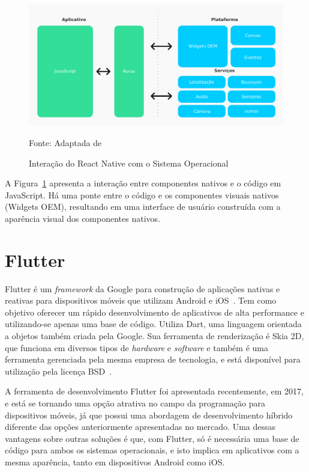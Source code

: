 \begin{figure}[H]
    \centering
    \includegraphics[width=15cm]{imagens/interacaoReactNative}
    \caption{Interação do React Native com o Sistema Operacional}
    Fonte: Adaptada de~\cite{yatsenko2019comparative}
    \label{fig: Interação React Native SO}
\end{figure}

A Figura~\ref{fig: Interação React Native SO} apresenta a interação entre componentes nativos e o código em JavaScript.
Há uma ponte entre o código e os componentes visuais nativos (Widgets OEM), resultando em uma interface de usuário construída com a aparência visual dos componentes nativos.


\section{Flutter}\label{sec:flutter}

Flutter é um \textit{framework} da Google para construção de aplicações nativas e reativas para dispositivos móveis que utilizam Android e iOS~\cite{zammetti2019practical}.
Tem como objetivo oferecer um rápido desenvolvimento de aplicativos de alta performance e utilizando-se apenas uma base de código.
Utiliza Dart, uma linguagem orientada a objetos também criada pela Google.
Sua ferramenta de renderização é Skia 2D, que funciona em diversos tipos de \textit{hardware} e \textit{software} e também é uma ferramenta gerenciada pela mesma empresa de tecnologia, e está disponível para utilização pela licença BSD~\cite{napoli2019beginning}.


A ferramenta de desenvolvimento Flutter foi apresentada recentemente, em 2017, e está se tornando uma opção atrativa no campo da programação para dispositivos móveis, já que possui uma abordagem de desenvolvimento híbrido diferente das opções anteriormente apresentadas no mercado.
Uma dessas vantagens sobre outras soluções é que, com Flutter, só é necessária uma base de código para ambos os sistemas operacionais, e isto implica em aplicativos com a mesma aparência, tanto em dispositivos Android como iOS\@.



